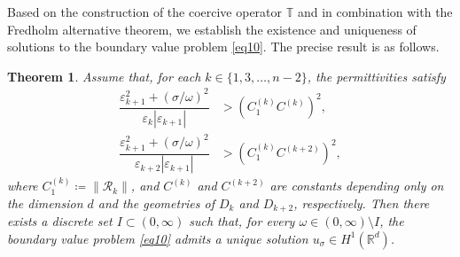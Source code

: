 \documentclass[12pt,reqno]{amsart}
\newtheorem{theorem}{Theorem}[section]
\numberwithin{equation}{section}
\begin{document}
Based on the construction of the coercive operator $\mathbb{T}$ and in combination with the Fredholm alternative theorem, we establish the existence and uniqueness of solutions to the boundary value problem
\eqref{eq10}. The precise result is as follows.



\begin{theorem}\label{thm:well-posedness}
Assume that, for each \(k \in \{1,3,\ldots,n-2\}\), the permittivities satisfy
\begin{equation}\label{eq23}
\begin{aligned}
\dfrac{\varepsilon_{k+1}^2+(\sigma/\omega)^2}{\varepsilon_k|\varepsilon_{k+1}|}
&> (C_1^{(k)} C^{(k)})^2, \\
\dfrac{\varepsilon_{k+1}^2+(\sigma/\omega)^2}{\varepsilon_{k+2}|\varepsilon_{k+1}|}
&> (C_1^{(k)} C^{(k+2)})^2,
\end{aligned}
\end{equation}
where \(C_1^{(k)} \coloneqq \|\mathcal{R}_k\|\), and \(C^{(k)}\) and \(C^{(k+2)}\) are constants depending only on the dimension \(d\) and the geometries of \(D_k\) and \(D_{k+2}\), respectively. Then there exists a discrete set \(I \subset (0,\infty)\) such that, for every \(\omega \in (0,\infty)\setminus I\), the boundary value problem \eqref{eq10} admits a unique solution \(u_\sigma \in H^1(\mathbb{R}^d)\).
\end{theorem}
\end{document}
